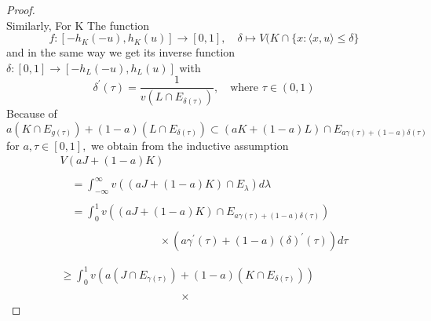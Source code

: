 \documentclass[oneside]{book}
\begin{document}
\begin{proof}
\[		\]
		Similarly, For K
		The function
		\[
		f:\left[-h_{K}(-u), h_{K}(u)\right] \rightarrow[0,1], \quad \delta \mapsto V(K \cap\{x:\langle x, u\rangle \leq  \delta \}
		\]
		and in the same way
		we get its inverse function $ \delta:[0,1] \rightarrow\left[-h_{L}(-u), h_{L}(u)\right]$     with 
		\[
		\delta^{\prime}(\tau)=\frac{1}{v\left(L \cap E_{\delta(\tau)}\right)}, \quad  \text{where } \tau \in(0,1)
		\]
		Because of
		\[
		a\left(K \cap E_{g(\tau)}\right)+(1-a)\left(L \cap E_{\delta(\tau)}\right) \subset(a K+(1-a) L) \cap E_{a \gamma(\tau)+(1-a) \delta(\tau)}
		\]
		for $a, \tau \in[0,1],$ we obtain from the inductive assumption
		\[
		\begin{array}{l}
		V(a J+(1-a) K) \\\\
		\quad=\int_{-\infty}^{\infty} v\left((a J+(1-a) K) \cap E_{\lambda}\right) d \lambda \\\\
		\quad=\int_{0}^{1} v\left((a J+(1-a) K) \cap E_{a \gamma(\tau)+(1-a) \delta(\tau)}\right) \\\\
		\quad  \quad \quad \quad \quad \quad \quad \quad \quad \times
		\left(a \gamma^{\prime}(\tau)+(1-a) (\delta)^{\prime}(\tau)\right) d \tau
		\\\\\\
		\geq \int_{0}^{1} v\left(a\left(J \cap E_{\gamma(\tau)}\right)+(1-a)\left(K \cap E_{\delta(\tau)}\right)\right)
		\\\\
		\quad \quad \quad \quad \quad \quad \quad \quad \quad \quad \quad
		
		\times
		

\end{array}\]
\end{proof}
\end{document}
